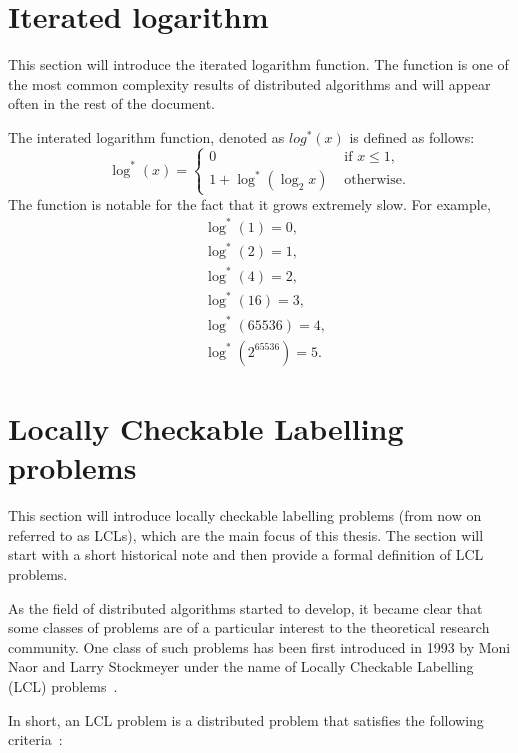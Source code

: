 \section{Iterated logarithm}

This section will introduce the iterated logarithm function. The function is
one of the most common complexity results of distributed algorithms and will
appear often in the rest of the document.

The interated logarithm function, denoted as $log^*(x)$ is defined as follows:
\[
    \log^*(x) = \begin{cases}
        0 & \text{ if $x \le 1$}, \\
        1 + \log^*(\log_2 x) & \text{ otherwise}.
    \end{cases}
\]
The function is notable for the fact that it grows extremely slow. For example,
\begin{align*}
  &\log^*(1) = 0, \\
  &\log^*(2) = 1, \\
  &\log^*(4) = 2, \\
  &\log^*(16) = 3, \\
  &\log^*(65536) = 4, \\
  &\log^*(2^{65536}) = 5.
\end{align*}

\section{Locally Checkable Labelling problems}

This section will introduce locally checkable labelling problems (from now on referred to as
LCLs), which are the main focus of this thesis. The section will start with
a short historical note and then provide a formal definition of
LCL problems.

As the field of distributed algorithms started to develop, it became clear
that some classes of problems
are of a particular interest to the theoretical research community.
One class of such problems has been first introduced in 1993 by
Moni Naor and Larry Stockmeyer under the name of Locally Checkable 
Labelling (LCL) problems~\cite{Naor1993}.

In short, an LCL problem is a distributed problem that satisfies the 
following criteria~\cite{Naor1993, Suomela2020}:

